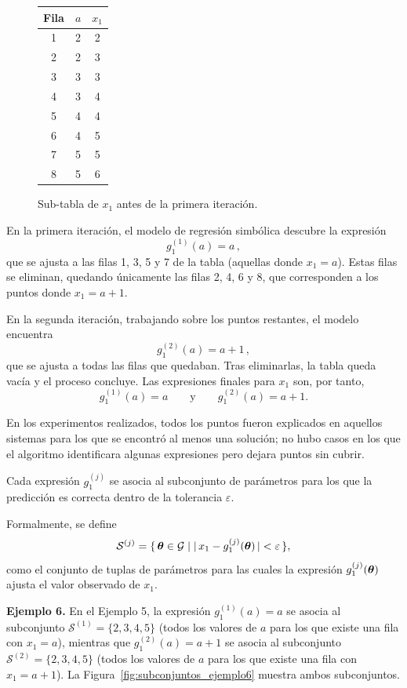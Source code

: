 \documentclass{article} \usepackage[utf8]{inputenc} \usepackage[spanish]{babel} \spanishdecimal{.} \usepackage{amsmath, amssymb, amsthm} \usepackage{bm} \usepackage{float} \usepackage{longtable} \usepackage[hidelinks]{hyperref}
\begin{document}
\begin{figure}[H]
\centering
\begin{tabular}{c|c|c}
Fila & \(a\) & \(x_1\) \\
\hline
1 & 2 & 2 \\
2 & 2 & 3 \\
3 & 3 & 3 \\
4 & 3 & 4 \\
5 & 4 & 4 \\
6 & 4 & 5 \\
7 & 5 & 5 \\
8 & 5 & 6
\end{tabular}
\caption{Sub-tabla de \(x_1\) antes de la primera iteración.}
\label{fig:busqueda_iterativa_tabla}
\end{figure}

En la primera iteración, el modelo de regresión simbólica descubre
la expresión
\[
g_1^{(1)}(a) = a\,,
\]
que se ajusta a las filas 1, 3, 5 y 7 de la tabla (aquellas donde
\(x_1 = a\)). Estas filas se eliminan, quedando únicamente las filas
2, 4, 6 y 8, que corresponden a los puntos donde \(x_1 = a + 1\).

En la segunda iteración, trabajando sobre los puntos restantes, el
modelo encuentra
\[
g_1^{(2)}(a) = a + 1\,,
\]
que se ajusta a todas las filas que quedaban. Tras eliminarlas, la
tabla queda vacía y el proceso concluye. Las expresiones finales
para \(x_1\) son, por tanto,
\[
g_1^{(1)}(a) = a \qquad\text{y}\qquad g_1^{(2)}(a) = a + 1 .
\]

En los experimentos realizados, todos los puntos fueron explicados
en aquellos sistemas para los que se encontró al menos una solución;
no hubo casos en los que el algoritmo identificara algunas
expresiones pero dejara puntos sin cubrir.

Cada expresión \(g_1^{(j)}\) se asocia al subconjunto de parámetros
para los que la predicción es correcta dentro de la tolerancia
\(\varepsilon\).

Formalmente, se define
\[
\mathcal{S}^{(j)} = \{\,\boldsymbol{\theta} \in \mathcal{G} \mid
|\,x_1 - g_1^{(j)}(\boldsymbol{\theta})\,| < \varepsilon \,\},
\]
como el conjunto de tuplas de parámetros para las cuales la
expresión \(g_1^{(j)}(\boldsymbol{\theta})\) ajusta el valor observado de
\(x_1\).

\bigskip
\noindent\textbf{Ejemplo 6.} En el Ejemplo 5, la expresión
\(g_1^{(1)}(a) = a\) se asocia al subconjunto
\(\mathcal{S}^{(1)} = \{2, 3, 4, 5\}\) (todos los valores de \(a\)
para los que existe una fila con \(x_1 = a\)), mientras que
\(g_1^{(2)}(a) = a + 1\) se asocia al subconjunto
\(\mathcal{S}^{(2)} = \{2, 3, 4, 5\}\) (todos los valores de \(a\)
para los que existe una fila con \(x_1 = a + 1\)). La
Figura~\ref{fig:subconjuntos_ejemplo6} muestra ambos subconjuntos.
\end{document}
